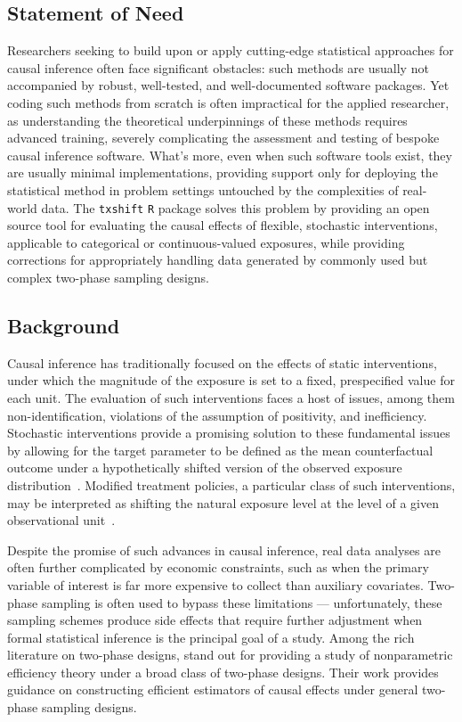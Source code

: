 \subsection{Statement of Need}

Researchers seeking to build upon or apply cutting-edge statistical approaches
for causal inference often face significant obstacles: such methods are usually
not accompanied by robust, well-tested, and well-documented software packages.
Yet coding such methods from scratch is often impractical for the applied
researcher, as understanding the theoretical underpinnings of these methods
requires advanced training, severely complicating the assessment and testing of
bespoke causal inference software. What's more, even when such software tools
exist, they are usually minimal implementations, providing support only for
deploying the statistical method in problem settings untouched by the
complexities of real-world data. The \texttt{txshift} \texttt{R} package solves
this problem by providing an open source tool for evaluating the causal effects
of flexible, stochastic interventions, applicable to categorical or
continuous-valued exposures, while providing corrections for appropriately
handling data generated by commonly used but complex two-phase sampling designs.

\subsection{Background}

Causal inference has traditionally focused on the effects of static
interventions, under which the magnitude of the exposure is set to a fixed,
prespecified value for each unit. The evaluation of such interventions faces
a host of issues, among them non-identification, violations of the assumption of
positivity, and inefficiency. Stochastic interventions provide a promising
solution to these fundamental issues by allowing for the target parameter to be
defined as the mean counterfactual outcome under a hypothetically shifted
version of the observed exposure distribution~\citep{diaz2012population}.
Modified treatment policies, a particular class of such interventions, may be
interpreted as shifting the natural exposure level at the level of a given
observational unit~\citep{haneuse2013estimation, diaz2018stochastic}.

Despite the promise of such advances in causal inference, real data analyses are
often further complicated by economic constraints, such as when the primary
variable of interest is far more expensive to collect than auxiliary covariates.
Two-phase sampling is often used to bypass these limitations --- unfortunately,
these sampling schemes produce side effects that require further adjustment when
formal statistical inference is the principal goal of a study. Among the rich
literature on two-phase designs, \citet{rose2011targeted2sd} stand out for
providing a study of nonparametric efficiency theory under a broad class of
two-phase designs. Their work provides guidance on constructing efficient
estimators of causal effects under general two-phase sampling designs.

